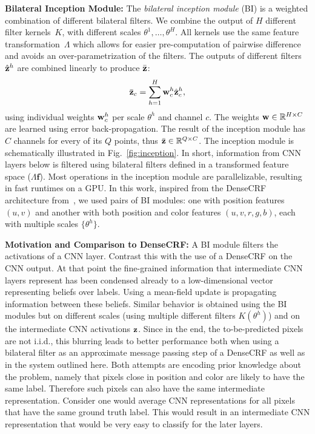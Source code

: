 {\bfseries Bilateral Inception Module:}
The \textit{bilateral inception module} (BI) is a weighted combination of different bilateral filters.
We combine the output of $H$ different filter kernels~$K$, with different scales $\theta^1,\ldots,\theta^H$.
All kernels use the same feature transformation~$\Lambda$ which allows for easier pre-computation of pairwise difference and avoids an over-parametrization of the filters.
The outputs of different filters $\hat{\mathbf{z}}^h$ are combined linearly to produce $\bar{\mathbf{z}}$:
\begin{equation}
\bar{\mathbf{z}}_c = \sum_{h=1}^H \mathbf{w}_c^h \hat{\mathbf{z}}_c^h,
  \label{eq:module}
\end{equation}
using individual weights $\mathbf{w}_c^h$ per scale $\theta^h$ and channel $c$.
The weights $\mathbf{w} \in \mathbb{R}^{H\times C}$ are learned using error back-propagation.
The result of the inception module has $C$ channels for every of its $Q$ points, thus $\bar{\mathbf{z}} \in \mathbb{R}^{Q \times C}$.
The inception module is schematically illustrated in Fig.~\ref{fig:inception}.
In short, information from CNN layers below is filtered using bilateral filters defined in a transformed feature space ($\Lambda \mathbf{f}$).
Most operations in the inception module are parallelizable, resulting in fast runtimes on a GPU.
In this work, inspired from the DenseCRF architecture from~\cite{krahenbuhl2012efficient},
we used pairs of BI modules: one with position features $(u,v)$ and another with both position and
color features $(u,v,r,g,b)$, each with multiple scales $\{\theta^h\}$.

{\bfseries Motivation and Comparison to DenseCRF:}
A BI module filters the activations of a CNN layer. Contrast this with the use of a DenseCRF on the CNN
output. At that point the fine-grained information that intermediate CNN layers represent has been condensed already to a low-dimensional vector representing beliefs over labels. Using a mean-field update is propagating information between these beliefs. Similar behavior is obtained using the BI modules but on different scales (using multiple different filters $K(\theta^h)$) and on the intermediate CNN activations $\mathbf{z}$. Since in the end, the to-be-predicted pixels are not i.i.d., this blurring leads to better performance both when using a bilateral filter as an approximate message passing step of a DenseCRF as well as in the system outlined here. Both attempts are encoding prior knowledge about the problem, namely that pixels close in position and color are likely to have the same label. Therefore such pixels can also have the same intermediate representation. Consider one would average CNN representations for all pixels that have the same ground truth label. This would result in an intermediate CNN representation that would be very easy to classify for the later layers.

